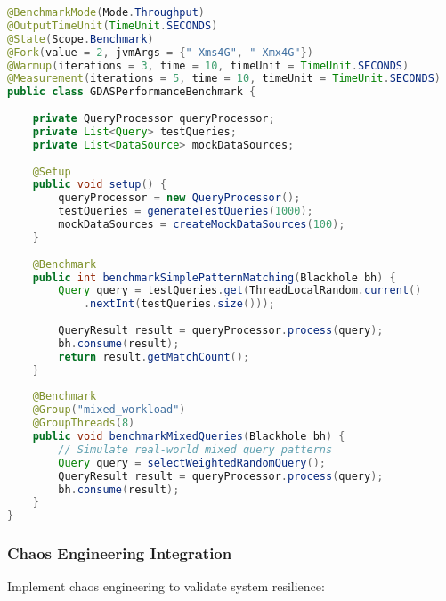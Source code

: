 \documentclass[11pt,a4paper]{article}
\begin{document}
\begin{lstlisting}[language=Java, caption=JMH Performance Testing]
@BenchmarkMode(Mode.Throughput)
@OutputTimeUnit(TimeUnit.SECONDS)
@State(Scope.Benchmark)
@Fork(value = 2, jvmArgs = {"-Xms4G", "-Xmx4G"})
@Warmup(iterations = 3, time = 10, timeUnit = TimeUnit.SECONDS)
@Measurement(iterations = 5, time = 10, timeUnit = TimeUnit.SECONDS)
public class GDASPerformanceBenchmark {
    
    private QueryProcessor queryProcessor;
    private List<Query> testQueries;
    private List<DataSource> mockDataSources;
    
    @Setup
    public void setup() {
        queryProcessor = new QueryProcessor();
        testQueries = generateTestQueries(1000);
        mockDataSources = createMockDataSources(100);
    }
    
    @Benchmark
    public int benchmarkSimplePatternMatching(Blackhole bh) {
        Query query = testQueries.get(ThreadLocalRandom.current()
            .nextInt(testQueries.size()));
        
        QueryResult result = queryProcessor.process(query);
        bh.consume(result);
        return result.getMatchCount();
    }
    
    @Benchmark
    @Group("mixed_workload")
    @GroupThreads(8)
    public void benchmarkMixedQueries(Blackhole bh) {
        // Simulate real-world mixed query patterns
        Query query = selectWeightedRandomQuery();
        QueryResult result = queryProcessor.process(query);
        bh.consume(result);
    }
}
\end{lstlisting}

\subsubsection{Chaos Engineering Integration}

Implement chaos engineering to validate system resilience:
\end{document}
